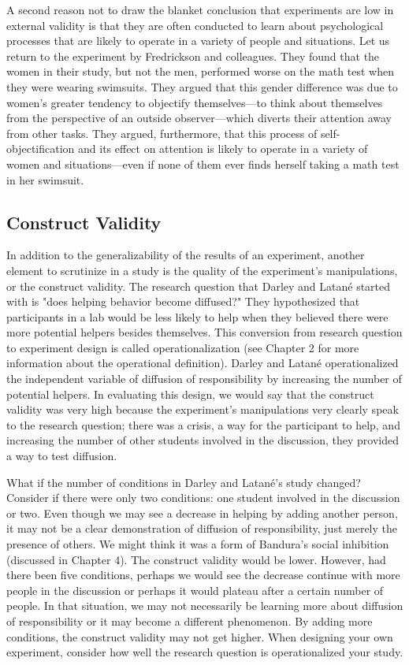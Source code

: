 A second reason not to draw the blanket conclusion that experiments are low in external validity is that they are often conducted to learn about psychological processes that are likely to operate in a variety of people and situations. Let us return to the experiment by Fredrickson and colleagues. They found that the women in their study, but not the men, performed worse on the math test when they were wearing swimsuits. They argued that this gender difference was due to women's greater tendency to objectify themselves---to think about themselves from the perspective of an outside observer---which diverts their attention away from other tasks. They argued, furthermore, that this process of self-objectification and its effect on attention is likely to operate in a variety of women and situations---even if none of them ever finds herself taking a math test in her swimsuit.

\subsection{Construct Validity}

In addition to the generalizability of the results of an experiment, another element to scrutinize in a study is the quality of the experiment's manipulations, or the construct validity. The research question that Darley and Latan\'e started with is "does helping behavior become diffused?" They hypothesized that participants in a lab would be less likely to help when they believed there were more potential helpers besides themselves. This conversion from research question to experiment design is called operationalization (see Chapter 2 for more information about the operational definition). Darley and Latan\'e operationalized the independent variable of diffusion of responsibility by increasing the number of potential helpers. In evaluating this design, we would say that the construct validity was very high because the experiment's manipulations very clearly speak to the research question; there was a crisis, a way for the participant to help, and increasing the number of other students involved in the discussion, they provided a way to test diffusion.

What if the number of conditions in Darley and Latan\'e's study changed? Consider if there were only two conditions: one student involved in the discussion or two. Even though we may see a decrease in helping by adding another person, it may not be a clear demonstration of diffusion of responsibility, just merely the presence of others. We might think it was a form of Bandura's social inhibition (discussed in Chapter 4). The construct validity would be lower. However, had there been five conditions, perhaps we would see the decrease continue with more people in the discussion or perhaps it would plateau after a certain number of people. In that situation, we may not necessarily be learning more about diffusion of responsibility or it may become a different phenomenon. By adding more conditions, the construct validity may not get higher. When designing your own experiment, consider how well the research question is operationalized your study.

